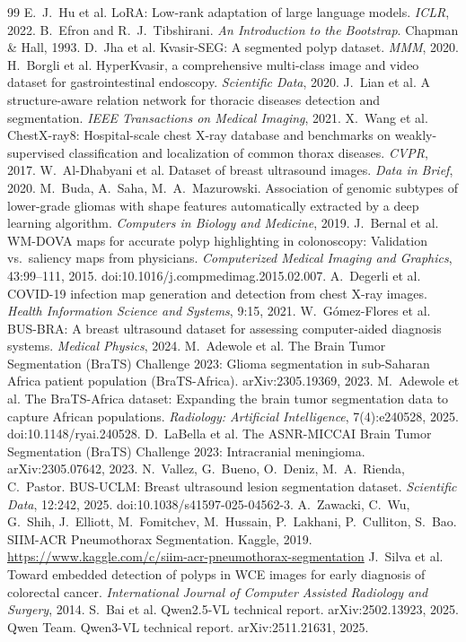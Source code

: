\documentclass[11pt]{article}
\begin{document}
\begin{thebibliography}{99}
 E.~J.~Hu et al. LoRA: Low-rank adaptation of large language models. \emph{ICLR}, 2022.
 B.~Efron and R.~J.~Tibshirani. \emph{An Introduction to the Bootstrap}. Chapman \& Hall, 1993.
 D.~Jha et al. Kvasir-SEG: A segmented polyp dataset. \emph{MMM}, 2020.
 H.~Borgli et al. HyperKvasir, a comprehensive multi-class image and video dataset for gastrointestinal endoscopy. \emph{Scientific Data}, 2020.
 J.~Lian et al. A structure-aware relation network for thoracic diseases detection and segmentation. \emph{IEEE Transactions on Medical Imaging}, 2021.
 X.~Wang et al. ChestX-ray8: Hospital-scale chest X-ray database and benchmarks on weakly-supervised classification and localization of common thorax diseases. \emph{CVPR}, 2017.
 W.~Al-Dhabyani et al. Dataset of breast ultrasound images. \emph{Data in Brief}, 2020.
 M.~Buda, A.~Saha, M.~A.~Mazurowski. Association of genomic subtypes of lower-grade gliomas with shape features automatically extracted by a deep learning algorithm. \emph{Computers in Biology and Medicine}, 2019.
 J.~Bernal et al. WM-DOVA maps for accurate polyp highlighting in colonoscopy: Validation vs.\ saliency maps from physicians. \emph{Computerized Medical Imaging and Graphics}, 43:99--111, 2015. doi:10.1016/j.compmedimag.2015.02.007.
 A.~Degerli et al. COVID-19 infection map generation and detection from chest X-ray images. \emph{Health Information Science and Systems}, 9:15, 2021.
 W.~G\'omez-Flores et al. BUS-BRA: A breast ultrasound dataset for assessing computer-aided diagnosis systems. \emph{Medical Physics}, 2024.
 M.~Adewole et al. The Brain Tumor Segmentation (BraTS) Challenge 2023: Glioma segmentation in sub-Saharan Africa patient population (BraTS-Africa). arXiv:2305.19369, 2023.
 M.~Adewole et al. The BraTS-Africa dataset: Expanding the brain tumor segmentation data to capture African populations. \emph{Radiology: Artificial Intelligence}, 7(4):e240528, 2025. doi:10.1148/ryai.240528.
 D.~LaBella et al. The ASNR-MICCAI Brain Tumor Segmentation (BraTS) Challenge 2023: Intracranial meningioma. arXiv:2305.07642, 2023.
 N.~Vallez, G.~Bueno, O.~Deniz, M.~A.~Rienda, C.~Pastor. BUS-UCLM: Breast ultrasound lesion segmentation dataset. \emph{Scientific Data}, 12:242, 2025. doi:10.1038/s41597-025-04562-3.
 A.~Zawacki, C.~Wu, G.~Shih, J.~Elliott, M.~Fomitchev, M.~Hussain, P.~Lakhani, P.~Culliton, S.~Bao. SIIM-ACR Pneumothorax Segmentation. Kaggle, 2019. \url{https://www.kaggle.com/c/siim-acr-pneumothorax-segmentation}
 J.~Silva et al. Toward embedded detection of polyps in WCE images for early diagnosis of colorectal cancer. \emph{International Journal of Computer Assisted Radiology and Surgery}, 2014.
 S.~Bai et al. Qwen2.5-VL technical report. arXiv:2502.13923, 2025.
 Qwen Team. Qwen3-VL technical report. arXiv:2511.21631, 2025.
\end{thebibliography}
\end{document}
